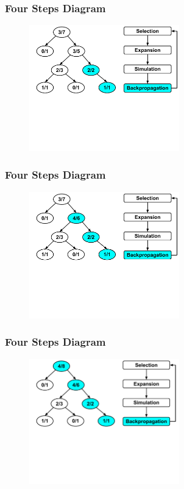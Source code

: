 \documentclass{beamer}
\begin{document}
\begin{frame}[fragile]
\frametitle{Four Steps Diagram}
\begin{figure}[h]
	\includegraphics[width=6.5cm]{Diagrams/MCTSShort/MCTSShortTwoFourTwo.pdf}
	\centering
\end{figure}
\end{frame}

\begin{frame}[fragile]
\frametitle{Four Steps Diagram}
\begin{figure}[h]
	\includegraphics[width=6.5cm]{Diagrams/MCTSShort/MCTSShortTwoFourThree.pdf}
	\centering
\end{figure}
\end{frame}

\begin{frame}[fragile]
\frametitle{Four Steps Diagram}
\begin{figure}[h]
	\includegraphics[width=6.5cm]{Diagrams/MCTSShort/MCTSShortTwoFourFour.pdf}
	\centering
\end{figure}
\end{frame}
\end{document}
